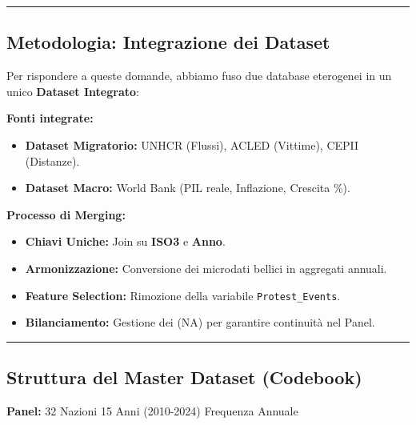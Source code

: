 \documentclass[
  letterpaper,
  DIV=11,
  numbers=noendperiod]{scrartcl}
\providecommand{\tightlist}{%
  \setlength{\itemsep}{0pt}\setlength{\parskip}{0pt}}
\begin{document}
\begin{center}\rule{0.5\linewidth}{0.5pt}\end{center}

\subsection{Metodologia: Integrazione dei
Dataset}\label{metodologia-integrazione-dei-dataset}

Per rispondere a queste domande, abbiamo fuso due database eterogenei in
un unico \textbf{Dataset Integrato}:

\textbf{Fonti integrate:}

\begin{itemize}
\tightlist
\item
  \textbf{Dataset Migratorio:} UNHCR (Flussi), ACLED (Vittime), CEPII
  (Distanze).
\item
  \textbf{Dataset Macro:} World Bank (PIL reale, Inflazione, Crescita
  \%).
\end{itemize}

\textbf{Processo di Merging:}

\begin{itemize}
\tightlist
\item
  \textbf{Chiavi Uniche:} Join su \textbf{ISO3} e \textbf{Anno}.
\item
  \textbf{Armonizzazione:} Conversione dei microdati bellici in
  aggregati annuali.
\item
  \textbf{Feature Selection:} Rimozione della variabile
  \texttt{Protest\_Events}.
\item
  \textbf{Bilanciamento:} Gestione dei (NA) per garantire continuità nel
  Panel.
\end{itemize}

\begin{center}\rule{0.5\linewidth}{0.5pt}\end{center}

\subsection{Struttura del Master Dataset
(Codebook)}\label{struttura-del-master-dataset-codebook}

\textbf{Panel:} 32 Nazioni \textbar{} 15 Anni (2010-2024) \textbar{}
Frequenza Annuale
\end{document}
